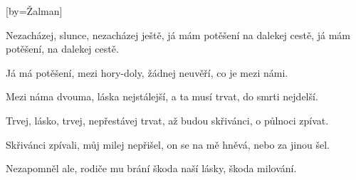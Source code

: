 [by={Žalman}]

\beginverse{}
Nezacházej, slunce, nezacházej ještě,
já mám potěšení na dalekej cestě,
já mám potěšení,  na dalekej cestě.
\endverse{}

\beginverse{}
Já má potěšení, mezi hory-doly,
\lrep{} žádnej neuvěří, co je mezi námi. \rrep{}
\endverse{}

\beginverse{}
Mezi náma dvouma, láska nejstálejší,
\lrep{} a ta musí trvat, do smrti nejdelší. \rrep{}
\endverse{}

\beginverse{}
Trvej, lásko, trvej, nepřestávej trvat,
\lrep{} až budou skřivánci, o půlnoci zpívat. \rrep{}
\endverse{}

\beginverse{}
Skřivánci zpívali, můj milej nepřišel,
\lrep{} on se na mě hněvá, nebo za jinou šel. \rrep{}
\endverse{}

\beginverse{}
Nezapomněl ale, rodiče mu brání
\lrep{} škoda naší lásky, škoda milování. \rrep{}
\endverse{}

\endsong{}
